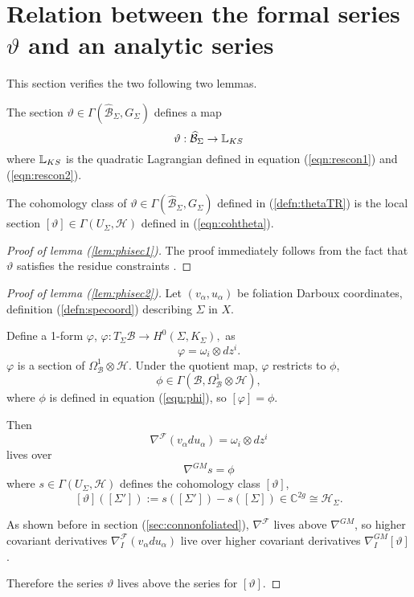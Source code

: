     \section{Relation between the formal series \texorpdfstring{\( \vartheta\)}{theta} and an analytic series}
    \label{sec:formalandanalytic}
    This section verifies the two following two lemmas.
    \begin{lem}   \label{lem:phisec1}
    The section \( \vartheta\in\Gamma(\widehat{\mathcal{B}}_{\Sigma},G_\Sigma)\) defines a map
    \[ \vartheta:\widehat{\mathcal{B}}_{\Sigma}\to\mathbb{L}_{KS} \]
    where \(\mathbb{L}_{KS}\) is the quadratic Lagrangian defined in equation (\ref{eqn:rescon1}) and (\ref{eqn:rescon2}).
    \end{lem}
    
    \begin{lem}  \label{lem:phisec2}
    The cohomology class of \(\vartheta\in\Gamma(\widehat{\mathcal{B}}_{\Sigma},G_\Sigma)\) defined in (\ref{defn:thetaTR}) is the local section  \([\vartheta]\in \Gamma(U_\Sigma, \mathcal{H})\) defined in (\ref{eqn:cohtheta}). 
    \end{lem} 

    
    
    \begin{proof}[Proof of lemma (\ref{lem:phisec1})]
    The proof immediately follows from the fact that \( \vartheta\) satisfies the residue constraints \cite{chaimanowong2020airy}.
    \end{proof}
    
    
    \begin{proof}[Proof of lemma (\ref{lem:phisec2})]
    Let  \( (v_\alpha, u_\alpha ) \) be foliation Darboux coordinates, definition (\ref{defn:specoord}) describing \( \Sigma\) in \(X\).
    
    Define a 1-form \(\varphi\), \( \varphi :T_{\Sigma}\mathcal{B}\rightarrow  H^0(\Sigma,K_\Sigma), \)
    as 
    \[\varphi =  \omega_i\otimes dz^i.\]
    \( \varphi\) is a section of \(\Omega_{\mathcal{B}}^1\otimes \mathcal{H}\). Under the quotient map, \( \varphi\) restricts to \( \phi\),
    \[ \phi\in\Gamma(\mathcal{B},\Omega_{\mathcal{B}}^1\otimes\mathcal{H} ),\]
    where \( \phi\) is defined in equation (\ref{eqn:phi}), so \( [\varphi] = \phi \).
    
    Then 
    \[ \nabla^{\mathcal{F}} (v_\alpha du_\alpha)=\omega_i\otimes dz^i\]
    lives over 
    \[ \nabla^{GM}s=\phi\] 
    where \( s\in\Gamma(U_\Sigma,\mathcal{H})\) defines the cohomology class \( [\vartheta]\),
    \[ [\vartheta]([\Sigma']):=s([\Sigma'])-s([\Sigma])\in\mathbb{C}^{2g}\cong \mathcal{H}_\Sigma .\]

    As shown before in section (\ref{sec:connonfoliated}), \( \nabla^{\mathcal{F}} \) lives above \(\nabla^{GM}\), so higher covariant derivatives \(\nabla^\mathcal{F}_I(v_\alpha du_\alpha)\) live over higher covariant derivatives \(\nabla^{GM}_I[\vartheta]\).  
    
    
    Therefore the series \(\vartheta\) lives above the series for \([\vartheta]\).
    \end{proof}
    
